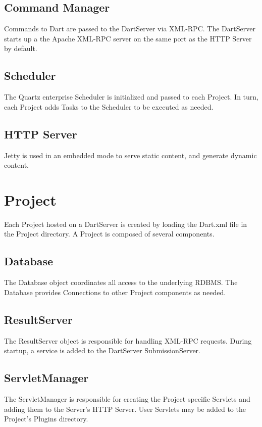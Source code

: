 \documentclass{InsightBook}
\begin{document}
\subsection{Command Manager}
Commands to Dart are passed to the DartServer via XML-RPC.  The
DartServer starts up a the Apache XML-RPC server on the same port as
the HTTP Server by default.

\subsection{Scheduler}
The Quartz enterprise Scheduler is initialized and passed to each
Project.  In turn, each Project adds Tasks to the Scheduler to be
executed as needed.

\subsection{HTTP Server}
Jetty is used in an embedded mode to serve static content, and
generate dynamic content.

\section{Project}
Each Project hosted on a DartServer is created by loading the Dart.xml
file in the Project directory.  A Project is composed of several
components.

\subsection{Database}
The Database object coordinates all access to the underlying RDBMS.
The Database provides Connections to other Project components as
needed.

\subsection{ResultServer}
The ResultServer object is responsible for handling XML-RPC requests.
During startup, a service is added to the DartServer SubmissionServer.

\subsection{ServletManager}
The ServletManager is responsible for creating the Project specific
Servlets and adding them to the Server's HTTP Server.  User Servlets
may be added to the Project's Plugins directory.
\end{document}
